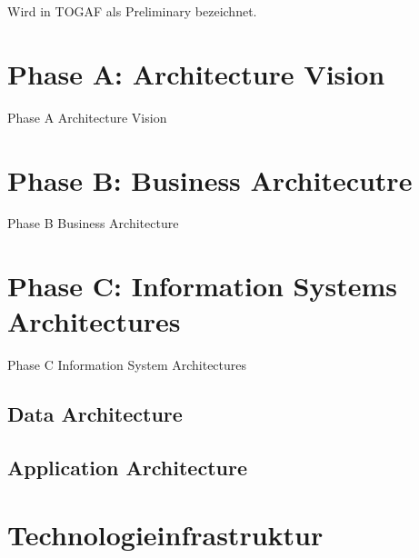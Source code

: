 Wird in TOGAF als Preliminary bezeichnet.

\section{Phase A: Architecture Vision}
Phase A Architecture Vision
\section{Phase B: Business Architecutre}
Phase B Business Architecture

\section{Phase C: Information Systems Architectures}
Phase C Information System Architectures

\subsection{Data Architecture}

\subsection{Application Architecture}

\section{Technologieinfrastruktur}